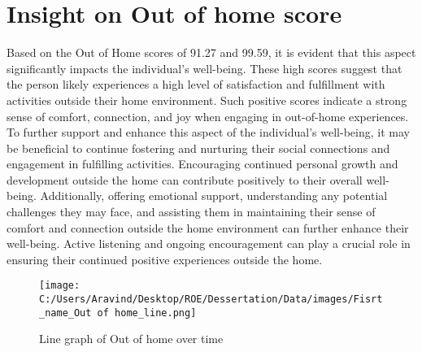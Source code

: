 \documentclass[10pt, a4paper]{article}%
\begin{document}
\section{Insight on Out of home score}%
\label{sec:InsightonOutofhomescore}%
Based on the Out of Home scores of 91.27 and 99.59, it is evident that this aspect significantly impacts the individual's well{-}being. These high scores suggest that the person likely experiences a high level of satisfaction and fulfillment with activities outside their home environment. Such positive scores indicate a strong sense of comfort, connection, and joy when engaging in out{-}of{-}home experiences.\newline%
\newline%
To further support and enhance this aspect of the individual's well{-}being, it may be beneficial to continue fostering and nurturing their social connections and engagement in fulfilling activities. Encouraging continued personal growth and development outside the home can contribute positively to their overall well{-}being.\newline%
\newline%
Additionally, offering emotional support, understanding any potential challenges they may face, and assisting them in maintaining their sense of comfort and connection outside the home environment can further enhance their well{-}being. Active listening and ongoing encouragement can play a crucial role in ensuring their continued positive experiences outside the home.%


\begin{figure}[H]%
\centering%
\texttt{[image: C:/Users/Aravind/Desktop/ROE/Dessertation/Data/images/Fisrt\_name\_Out of home\_line.png]}%
\caption{Line graph of Out of home over time}%
\end{figure}

%
\end{document}
